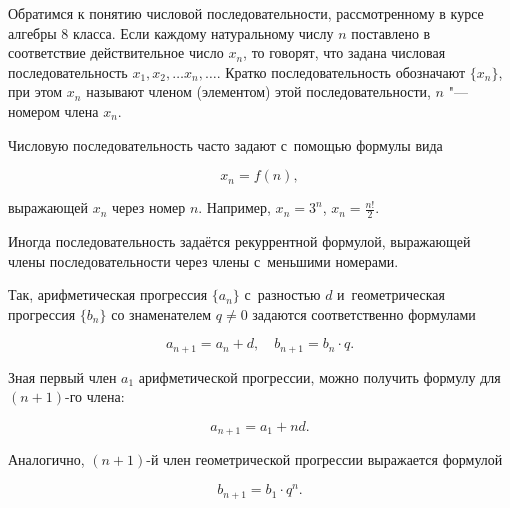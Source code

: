 
Обратимся к понятию числовой последовательности, рассмотренному в курсе алгебры 8 класса.
Если каждому натуральному числу $n$ поставлено в соответствие действительное число $x_{n}$,
то говорят, что задана числовая последовательность $x_1, x_2, \dots x_n, \dots$.
Кратко последовательность обозначают $\{x_{n}\}$, при этом $x_{n}$ называют членом
(элементом) этой последовательности, $n$ "--- номером члена $x_{n}$.

Числовую последовательность часто задают с~помощью формулы вида

\begin{equation*}
x_{n} = f(n),
\end{equation*}

\noindent
выражающей $x_{n}$ через номер $n$. Например, $x_{n} = 3^{n}$,
$\displaystyle x_{n} = \frac{n!}{2}$.

Иногда последовательность задаётся рекуррентной формулой, выражающей члены
последовательности через члены с~меньшими номерами.

Так, арифметическая прогрессия $\{a_{n}\}$ с~разностью $d$ и~геометрическая
прогрессия $\{b_{n}\}$ со знаменателем $q \ne 0$ задаются соответственно формулами

\begin{equation*}
a_{n+1} = a_{n} + d, \quad b_{n+1} = b_{n} \cdot q.
\end{equation*}

\noindent
Зная первый член $a_{1}$ арифметической прогрессии, можно получить формулу
для $(n+1)$-го члена:

\begin{equation*}
a_{n+1} = a_{1} + nd.
\end{equation*}

\noindent
Аналогично, $(n+1)$-й член геометрической прогрессии выражается формулой

\begin{equation*}
b_{n+1} = b_{1} \cdot q^{n}.
\end{equation*}

